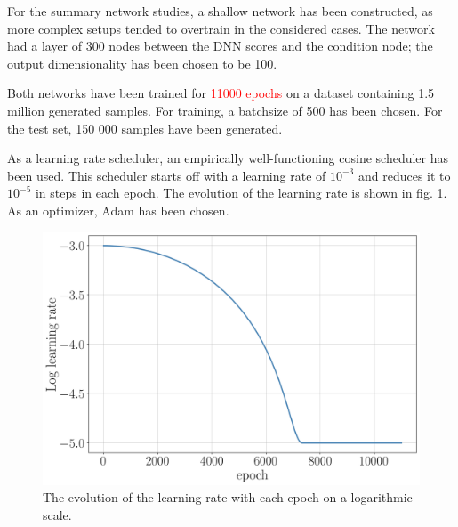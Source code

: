 For the summary network studies, a shallow network has been constructed, as more complex setups tended to overtrain in the considered cases. The network had a layer of 300 nodes between the DNN scores and the condition node; the output dimensionality has been chosen to be 100.

Both networks have been trained for \textcolor{red}{11000 epochs} on a dataset containing 1.5 million generated samples. For training, a batchsize of 500 has been chosen. For the test set, 150 000 samples have been generated.

As a learning rate scheduler, an empirically well-functioning cosine scheduler has been used. This scheduler starts off with a learning rate of $10^{-3}$ and reduces it to $10^{-5}$ in steps in each epoch. The evolution of the learning rate is shown in fig. \ref{fig:lr}. As an optimizer, Adam has been chosen.

\begin{figure}
	\centering
	\includegraphics[width=0.6\linewidth]{figures/network_setup/lr}
	\caption{The evolution of the learning rate with each epoch on a logarithmic scale.}
	\label{fig:lr}
\end{figure}
